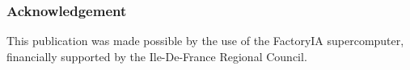 \subsubsection*{Acknowledgement}

This publication was made possible by the use of the FactoryIA supercomputer, financially supported by the Ile-De-France Regional Council.